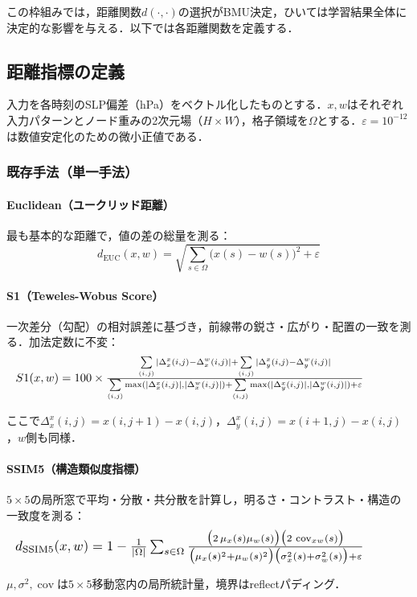 \documentclass{jarticle}
\theoremstyle{definition}
\newcommand{\halfeq}[2][0.90\linewidth]{%
  \begin{equation}
    \makebox[\linewidth][l]{\resizebox{#1}{!}{\ensuremath{#2}}}%
  \end{equation}
}
\begin{document}
この枠組みでは，距離関数$d(\cdot, \cdot)$の選択がBMU決定，ひいては学習結果全体に決定的な影響を与える．以下では各距離関数を定義する．

\subsection{距離指標の定義}
入力を各時刻のSLP偏差（hPa）をベクトル化したものとする．$x,w$はそれぞれ入力パターンとノード重みの2次元場（$H\times W$），格子領域を$\Omega$とする．$\varepsilon=10^{-12}$は数値安定化のための微小正値である．

\subsubsection*{既存手法（単一手法）}
\paragraph{Euclidean（ユークリッド距離）}
最も基本的な距離で，値の差の総量を測る：
\begin{equation}
d_{\mathrm{EUC}}(x,w)=\sqrt{\sum_{s\in\Omega}\bigl(x(s)-w(s)\bigr)^2+\varepsilon}
\end{equation}

\paragraph{S1（Teweles-Wobus Score）}
一次差分（勾配）の相対誤差に基づき，前線帯の鋭さ・広がり・配置の一致を測る．加法定数に不変：
\halfeq{%
S1(x,w)=100\times
\frac{\sum\limits_{(i,j)}|\Delta_x^x(i,j)-\Delta_x^w(i,j)|+\sum\limits_{(i,j)}|\Delta_y^x(i,j)-\Delta_y^w(i,j)|}
{\sum\limits_{(i,j)}\max(|\Delta_x^x(i,j)|,|\Delta_x^w(i,j)|)+\sum\limits_{(i,j)}\max(|\Delta_y^x(i,j)|,|\Delta_y^w(i,j)|)+\varepsilon}%
}
ここで$\Delta_x^x(i,j)=x(i,j+1)-x(i,j)$，$\Delta_y^x(i,j)=x(i+1,j)-x(i,j)$，$w$側も同様．

\paragraph{SSIM5（構造類似度指標）}
$5\times 5$の局所窓で平均・分散・共分散を計算し，明るさ・コントラスト・構造の一致度を測る：
\halfeq{%
d_{\mathrm{SSIM5}}(x,w)=1-\frac{1}{|\Omega|}\sum_{s\in\Omega}
\frac{\bigl(2\,\mu_x(s)\mu_w(s)\bigr)\bigl(2\,\operatorname{cov}_{xw}(s)\bigr)}
{\bigl(\mu_x(s)^2+\mu_w(s)^2\bigr)\bigl(\sigma_x^2(s)+\sigma_w^2(s)\bigr)+\varepsilon}%
}
$\mu,\sigma^2,\operatorname{cov}$は$5\times 5$移動窓内の局所統計量，境界はreflectパディング．
\end{document}
